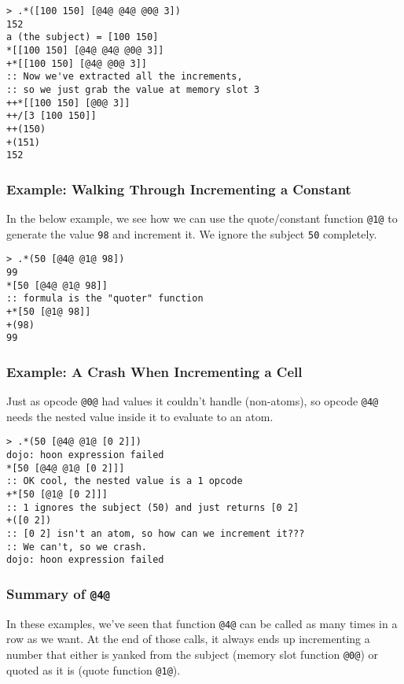 \documentclass[twoside]{article}
\begin{document}
\begin{lstlisting}[style=listingblock]
> .*([100 150] [@4@ @4@ @0@ 3])
152
a (the subject) = [100 150]
*[[100 150] [@4@ @4@ @0@ 3]]
+*[[100 150] [@4@ @0@ 3]]
:: Now we've extracted all the increments,
:: so we just grab the value at memory slot 3
++*[[100 150] [@0@ 3]]
++/[3 [100 150]]
++(150)
+(151)
152
\end{lstlisting}

\subsubsection{Example:  Walking Through Incrementing a Constant}

In the below example, we see how we can use the quote/constant function \lstinline[style=inlinecode]{@1@} to generate the value \lstinline[style=inlinecode]{98} and increment it. We ignore the subject \lstinline[style=inlinecode]{50} completely.

\begin{lstlisting}[style=listingblock]
> .*(50 [@4@ @1@ 98])
99
*[50 [@4@ @1@ 98]]
:: formula is the "quoter" function
+*[50 [@1@ 98]]
+(98)
99
\end{lstlisting}

\subsubsection{Example:  A Crash When Incrementing a Cell}

Just as opcode \lstinline[style=inlinecode]{@0@} had values it couldn't handle (non-atoms), so opcode \lstinline[style=inlinecode]{@4@} needs the nested value inside it to evaluate to an atom.

\begin{lstlisting}[style=listingblock]
> .*(50 [@4@ @1@ [0 2]])
dojo: hoon expression failed
*[50 [@4@ @1@ [0 2]]]
:: OK cool, the nested value is a 1 opcode
+*[50 [@1@ [0 2]]]
:: 1 ignores the subject (50) and just returns [0 2]
+([0 2])
:: [0 2] isn't an atom, so how can we increment it???
:: We can't, so we crash.
dojo: hoon expression failed
\end{lstlisting}

\subsubsection{Summary of \lstinline[style=inlinecode]{@4@}}

In these examples, we've seen that function \lstinline[style=inlinecode]{@4@} can be called as many times in a row as we want. At the end of those calls, it always ends up incrementing a number that either is yanked from the subject (memory slot function \lstinline[style=inlinecode]{@0@}) or quoted as it is (quote function \lstinline[style=inlinecode]{@1@}).
\end{document}
